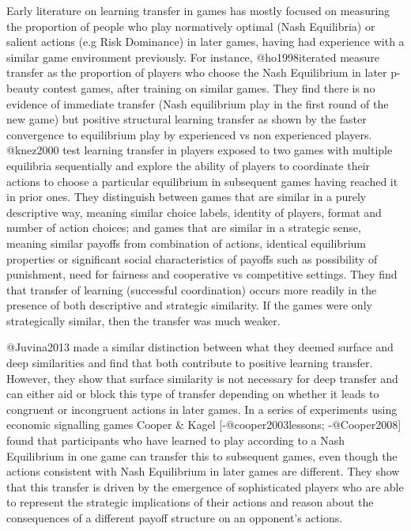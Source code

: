 \documentclass[man,floatsintext]{apa6}
\begin{document}
Early literature on learning transfer in games has mostly focused on measuring the proportion of people who play normatively optimal (Nash Equilibria) or salient actions (e.g Risk Dominance) in later games, having had experience with a similar game environment previously. For instance, @ho1998iterated measure transfer as the proportion of players who choose the Nash Equilibrium in later p-beauty contest games, after training on similar games. They find there is no evidence of immediate transfer (Nash equilibrium play in the first round of the new game) but positive structural learning transfer as shown by the faster convergence to equilibrium play by experienced vs non experienced players. @knez2000 test learning transfer in players exposed to two games with multiple equilibria sequentially and explore the ability of players to coordinate their actions to choose a particular equilibrium in subsequent games having reached it in prior ones. They distinguish between games that are similar in a purely descriptive way, meaning similar choice labels, identity of players, format and number of action choices; and games that are similar in a strategic sense, meaning similar payoffs from combination of actions, identical equilibrium properties or significant social characteristics of payoffs such as possibility of punishment, need for fairness and cooperative vs competitive settings. They find that transfer of learning (successful coordination) occurs more readily in the presence of both descriptive and strategic similarity. If the games were only strategically similar, then the transfer was much weaker.

@Juvina2013 made a similar distinction between what they deemed surface and deep similarities and find that both contribute to positive learning transfer. However, they show that surface similarity is not necessary for deep transfer and can either aid or block this type of transfer depending on whether it leads to congruent or incongruent actions in later games. In a series of experiments using economic signalling games Cooper \& Kagel {[}-@cooper2003lessons; -@Cooper2008{]} found that participants who have learned to play according to a Nash Equilibrium in one game can transfer this to subsequent games, even though the actions consistent with Nash Equilibrium in later games are different. They show that this transfer is driven by the emergence of sophisticated players who are able to represent the strategic implications of their actions and reason about the consequences of a different payoff structure on an opponent's actions.
\end{document}
